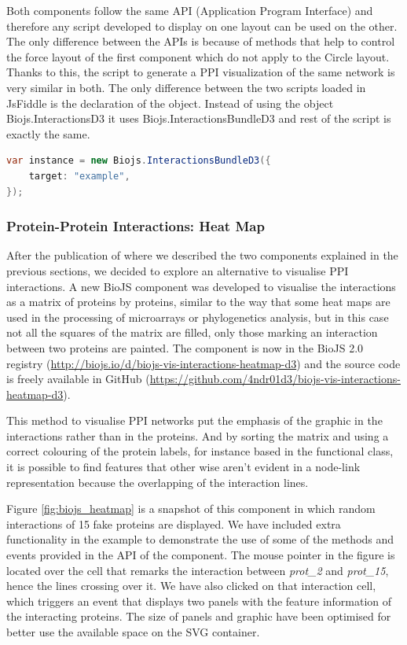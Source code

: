 Both components follow the same API (Application Program Interface) and therefore any script developed to display on one layout can be used on the other. The only difference between the APIs is because of methods that help to control the force layout of the first component which do not apply to the Circle layout. Thanks to this, the script to generate a PPI visualization of the same network is very similar in both.  The only difference between the two scripts loaded in JsFiddle is the declaration of the object. Instead of using the object Biojs.InteractionsD3 it uses Biojs.InteractionsBundleD3 and rest of the script is exactly the same.
\begin{lstlisting}[language=java]
var instance = new Biojs.InteractionsBundleD3({
    target: "example",
});
\end{lstlisting}





\subsubsection{Protein-Protein Interactions: Heat Map} \label{subsubsec:ppi3_biojs}
After the publication of \cite{SAL2014} where we described the two components explained in the previous sections, we decided to explore an alternative to visualise PPI interactions. A new BioJS component was developed to visualise the interactions as a matrix of proteins by proteins, similar to the way that some heat maps are used in the processing of microarrays or phylogenetics analysis, but in this case not all the squares of the matrix are filled, only those marking an interaction between two proteins are painted. The component is now in the BioJS 2.0 registry (\url{http://biojs.io/d/biojs-vis-interactions-heatmap-d3}) and the source code is freely available in GitHub (\url{https://github.com/4ndr01d3/biojs-vis-interactions-heatmap-d3}).

This method to visualise PPI networks put the emphasis of the graphic in the interactions rather than in the proteins. And by sorting the matrix and using a correct colouring of the protein labels, for instance based in the functional class, it is possible to find features that other wise aren't evident in a node-link representation because the overlapping of the interaction lines.

Figure \ref{fig:biojs_heatmap} is a snapshot of this component  in which random interactions of 15 fake proteins are displayed. We have included extra functionality in the example to demonstrate the use of some of the methods and events provided in the API of the component. The mouse pointer in the figure is located over the cell that remarks the interaction between \emph{prot\_2} and \emph{prot\_15}, hence the lines crossing over it. We have also clicked on that interaction cell, which triggers an event that displays two panels with the feature information of the interacting proteins. The size of panels and graphic have been optimised for better use the available space on the SVG container.

